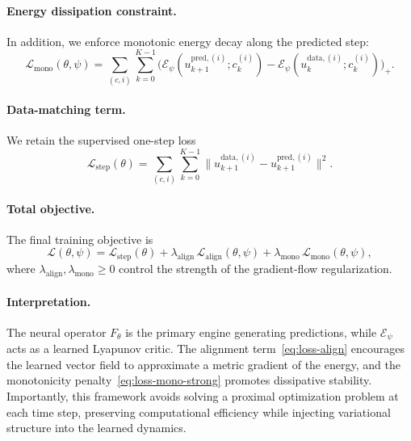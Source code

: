 \documentclass[11pt]{article}
\begin{document}
\paragraph{Energy dissipation constraint.}
In addition, we enforce monotonic energy decay along the predicted step:
\begin{equation}
\label{eq:loss-mono-strong}
\mathcal L_{\mathrm{mono}}(\theta,\psi)
=
\sum_{(c,i)}\sum_{k=0}^{K-1}
\Big(
\mathcal E_\psi(u_{k+1}^{\mathrm{pred},(i)}; c_k^{(i)})
-
\mathcal E_\psi(u_k^{\mathrm{data},(i)}; c_k^{(i)})
\Big)_+.
\end{equation}

\paragraph{Data-matching term.}
We retain the supervised one-step loss
\begin{equation}
\label{eq:loss-step-strong}
\mathcal L_{\mathrm{step}}(\theta)
=
\sum_{(c,i)}\sum_{k=0}^{K-1}
\big\|
u_{k+1}^{\mathrm{data},(i)}
-
u_{k+1}^{\mathrm{pred},(i)}
\big\|^2.
\end{equation}

\paragraph{Total objective.}
The final training objective is
\begin{equation}
\label{eq:loss-total-strong}
\mathcal L(\theta,\psi)
=
\mathcal L_{\mathrm{step}}(\theta)
+
\lambda_{\mathrm{align}}\,\mathcal L_{\mathrm{align}}(\theta,\psi)
+
\lambda_{\mathrm{mono}}\,\mathcal L_{\mathrm{mono}}(\theta,\psi),
\end{equation}
where $\lambda_{\mathrm{align}},\lambda_{\mathrm{mono}}\ge 0$
control the strength of the gradient-flow regularization.

\paragraph{Interpretation.}
The neural operator $F_\theta$ is the primary engine generating predictions,
while $\mathcal E_\psi$ acts as a learned Lyapunov critic.
The alignment term~\eqref{eq:loss-align} encourages the learned vector field
to approximate a metric gradient of the energy,
and the monotonicity penalty~\eqref{eq:loss-mono-strong}
promotes dissipative stability.
Importantly, this framework avoids solving a proximal optimization problem
at each time step, preserving computational efficiency
while injecting variational structure into the learned dynamics.
\end{document}
